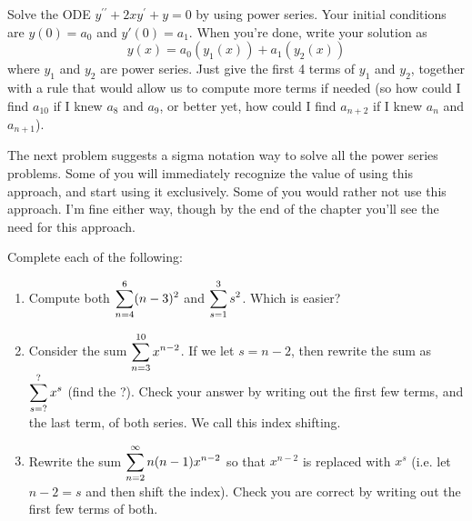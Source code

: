 \begin{problem}
 Solve the ODE $y^{\prime\prime}+2xy^\prime+y=0$ by using power series. Your initial conditions are $y(0)=a_0$ and $y'(0)=a_1$. When you're done, write your solution as
 $$y(x) =a_0 (y_1(x))+a_1(y_2(x))$$ where $y_1$ and $y_2$ are power series. Just give the first 4 terms of $y_1$ and $y_2$, together with a rule that would allow us to compute more terms if needed (so how could I find $a_{10}$ if I knew $a_8$ and $a_9$, or better yet, how could I find $a_{n+2}$ if I knew $a_n$ and $a_{n+1}$). 
\end{problem}

The next problem suggests a sigma notation way to solve all the power series problems. Some of you will immediately recognize the value of using this approach, and start using it exclusively.  Some of you would rather not use this approach.  I'm fine either way, though by the end of the chapter you'll see the need for this approach.

\begin{problem}
 Complete each of the following:
\begin{enumerate}
 \item Compute both $\displaystyle \sum_{n=4}^6 (n-3)^2$ and $\displaystyle \sum_{s=1}^3 s^2$.  Which is easier?
 \item Consider the sum $\displaystyle \sum_{n=3}^{10} x^{n-2}$. If we let $s=n-2$, then rewrite the sum as $\displaystyle \sum_{s=?}^? x^s$ (find the ?). Check your answer by writing out the first few terms, and the last term, of both series. We call this index shifting.
 \item Rewrite the sum $\displaystyle \sum_{n=2}^\infty n(n-1)x^{n-2}$ so that $x^{n-2}$ is replaced with $x^{s}$ (i.e. let $n-2=s$ and then shift the index). Check you are correct by writing out the first few terms of both.
\end{enumerate}

\end{problem}

